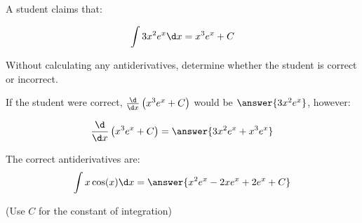 \documentclass{ximera}
\author{Jim Talamo}
\begin{document}
\begin{exercise}
A student claims that:

\[
\int 3x^2 e^{x} \d x =x^3 e^{x} +C
\]

Without calculating any antiderivatives, determine whether the student is correct or incorrect. 

\begin{multipleChoice}
\end{multipleChoice}

If the student were correct, $\frac{\d}{\d x} \left(x^3 e^{x} +C\right)$ would be $\answer{3x^2 e^{x}}$, however:

\[
\frac{\d}{\d x} \left(x^3 e^{x} +C\right) = \answer{3x^2e^x+x^3e^x}
\]

\begin{exercise}
The correct antiderivatives are:
\[
\int x \cos(x) \d x = \answer{x^2e^x-2xe^x+2e^x +C}
\]

(Use $C$ for the constant of integration)
\end{exercise}
\end{exercise}
\end{document}
